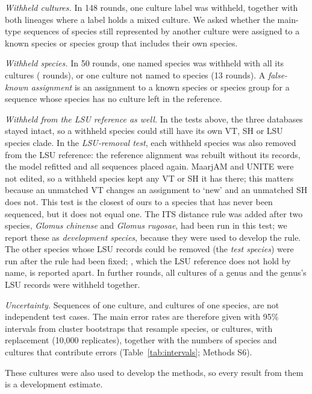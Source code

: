 \documentclass[11pt]{article}
\newcommand{\spn}[1]{\emph{#1}}   %
\begin{document}
\emph{Withheld cultures.} In 148 rounds, one culture label was withheld, together with both lineages where a label
holds a mixed culture. We asked whether the main-type sequences of species still represented by another culture
were assigned to a known species or species group that includes their own species.

\emph{Withheld species.} In 50 rounds, one named species was withheld with all its cultures (\NSpecies{} rounds),
or one culture not named to species (13 rounds). A \emph{false-known assignment} is an assignment to a known
species or species group for a sequence whose species has no culture left in the reference.

\emph{Withheld from the LSU reference as well.} In the tests above, the three databases stayed intact, so a
withheld species could still have its own VT, SH or LSU species clade. In the \emph{LSU-removal test}, each withheld
species was also removed from the LSU reference: the reference alignment was rebuilt without its records, the model
refitted and all sequences placed again. MaarjAM and UNITE were not edited, so a withheld species kept any VT or SH
it has there; this matters because an unmatched VT changes an assignment to `new' and an unmatched SH does not.
This test is the closest of ours to a species that has never been sequenced, but it does not equal one. The ITS
distance rule was added after two species, \spn{Glomus chinense} and \spn{Glomus rugosae}, had been run in this
test; we report these as \emph{development species}, because they were used to develop the rule. The
\MfourFolds{} other species whose LSU records could be removed (the \emph{test species}) were run after the rule had
been fixed; \spn{\MfourAbsentTarget}, which the LSU reference does not hold by name, is reported apart. In
\GenusFolds{} further rounds, all cultures of a genus and the genus's LSU records were withheld together.

\emph{Uncertainty.} Sequences of one culture, and cultures of one species, are not independent test cases. The main
error rates are therefore given with 95\% intervals from cluster bootstraps that resample species, or cultures,
with replacement (10,000 replicates), together with the numbers of species and cultures that contribute errors
(Table~\ref{tab:intervals}; Methods S6).

These cultures were also used to develop the methods, so every result from them is a development estimate.
\end{document}
